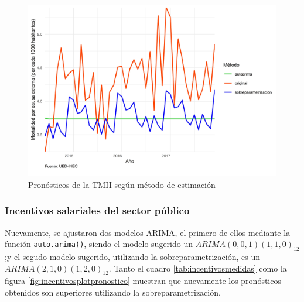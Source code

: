 \documentclass[
]{article}
\begin{document}
\begin{table}[!h]

\caption{\label{tab:unnamed-chunk-20}\label{tab:externasmedidas}Medidas de rendimiento según método de estimación para la Mortalidad por causa externa}
\centering
{}
\end{table}

\begin{figure}[!h]
\includegraphics[width=1\linewidth,height=1\textheight]{Tesis_files/figure-latex/externasplotpronostico-1} \caption{Pronósticos de la TMII según método de estimación}\label{fig:externasplotpronostico}
\end{figure}

\subsubsection{Incentivos salariales del sector público}

Nuevamente, se ajustaron dos modelos ARIMA, el primero de ellos mediante
la función \texttt{auto.arima()}, siendo el modelo sugerido un
\(ARIMA(0,0,1)(1,1,0)_{12}\);y el segudo modelo sugerido, utilizando la
sobreparametrización, es un \(ARIMA(2,1,0)(1,2,0)_{12}\). Tanto el
cuadro \ref{tab:incentivosmedidas} como la figura
\ref{fig:incentivosplotpronostico} muestran que nuevamente los
pronósticos obtenidos son superiores utilizando la sobreparametrización.
\end{document}
